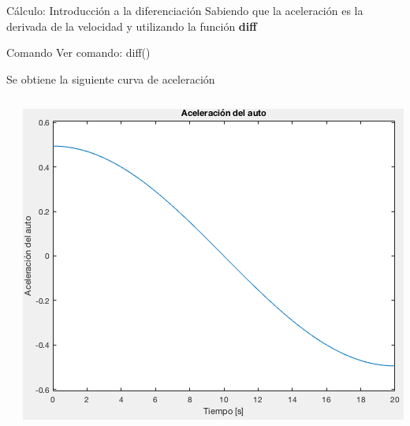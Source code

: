 \documentclass{bredelebeamer}
\begin{document}
\begin{frame}{Cálculo: Introducción a la diferenciación}
Sabiendo que la aceleración es la derivada de la velocidad y utilizando la función \textbf{diff}
\begin{exampleblock}{Comando}
Ver comando: diff()
\end{exampleblock}
Se obtiene la siguiente curva de aceleración
\begin{columns}
\begin{column}{0.5\textwidth}
\end{column}
\begin{column}{0.5\textwidth}
\begin{center}
\includegraphics[scale=0.3]{images/fig8.png}
\end{center}
\end{column}
\end{columns}
\end{frame}
\end{document}
